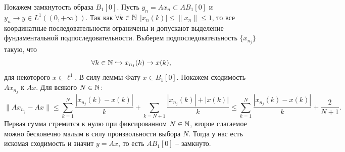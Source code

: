 \begin{solution}
    Покажем замкнутость образа $B_1[0]$.
    Пусть $y_n = Ax_n \subset AB_1[0]$ и $y_n \rightarrow y \in L^1((0, +\infty))$.
    Так как $\forall k \in \mathbb{N}$ $|x_n(k)| \leq \|x_n\| \leq 1$, то все координатные последовательности ограничены и допускают выделение фундаментальной подпоследовательности.
    Выберем подпоследовательность $\{x_{n_j}\}$ такую, что
    \[
        \forall k \in \mathbb{N} \hookrightarrow x_{n_j}(k) \rightarrow x(k),
    \]
    для некоторого $x \in \ell^1$.
    В силу леммы Фату $x \in B_1[0]$.
    Покажем сходимость $Ax_{n_j}$ к $Ax$.
    Для всякого $N \in \mathbb{N}\colon$
    \[
        \|Ax_{n_j} - Ax\| \leq \sum_{k = 1}^{N} \frac{|x_{n_j}(k) - x(k)|}{k} + \sum_{k = N + 1} \frac{|x_{n_j}(k)| + |x(k)|}{k} \leq \sum_{k = 1}^{N} \frac{|x_{n_j}(k) - x(k)|}{k} + \frac{2}{N + 1}.
    \]
    Первая сумма стремится к нулю при фиксированном $N \in \mathbb{N}$, второе слагаемое можно бесконечно малым в силу произвольности выбора $N$.
    Тогда у нас есть искомая сходимость и значит $y = Ax$, то есть $AB_1[0]$ -- замкнуто.
\end{solution}
